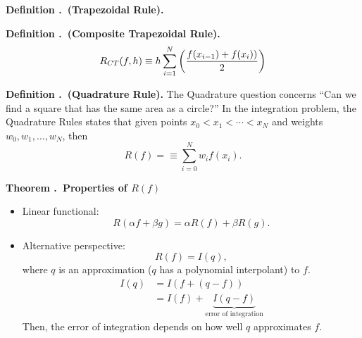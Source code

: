 \documentclass[12pt, a4paper]{article}
\newcounter{index}[subsection]
\newenvironment*{df}[1]{\par\noindent\textbf{Definition \thesubsection.\stepcounter{index}\theindex\ (#1).}}{\par}
\newenvironment*{thm}[1]{\begin{tcolorbox}\par\noindent\textbf{Theorem \thesubsection.\stepcounter{index}\theindex\ #1} \par}{\par\end{tcolorbox}}
\begin{document}
\begin{df}{Trapezoidal Rule}
\begin{center}
	\end{center}
\end{df}
\begin{df}{Composite Trapezoidal Rule}
	\[R_{CT}(f,h)\equiv h\sum_{i=1}^N\qty(\dfrac{f(x_{i-1})+f(x_i))}{2})\]	
\end{df}
\begin{df}{Quadrature Rule}
	The Quadrature question concerns ``Can we find a square that has the same area as a circle?'' In the integration problem, the Quadrature Rules states that given points $x_0<x_1<\cdots<x_N$ and weights $w_0,w_1,\dots,w_N$, then \[R(f)=\equiv\sum_{i=0}^N w_if(x_i).\]	
\end{df}
\begin{thm}{Properties of $R(f)$}
	\begin{itemize}
		\item Linear functional: \[R(\alpha f+\beta g)=\alpha R(f)+\beta R(g).\]
		\item Alternative perspective: \[R(f)=I(q),\] where $q$ is an approximation ($q$ has a polynomial interpolant) to $f$. \begin{align*}I(q)&=I(f+(q-f))\\&=I(f)+\underbrace{I(q-f)}_\text{error of integration}\end{align*} Then, the error of integration depends on how well $q$ approximates $f$.
	\end{itemize}	
\end{thm}
\end{document}

